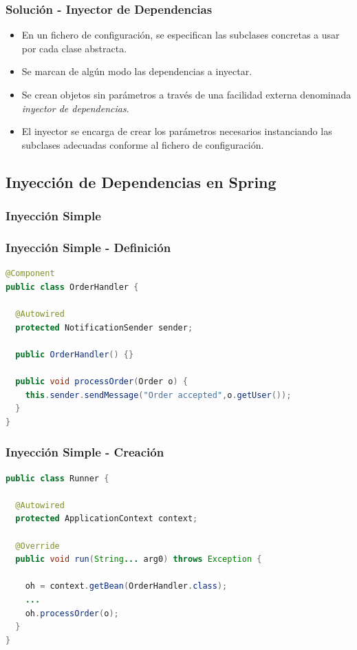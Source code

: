 \documentclass[a4paper,t,xcolor=pst,dvips,colortheme]{beamer}
\begin{document}
\begin{frame}[c]
	\frametitle{Solución - Inyector de Dependencias}
    \begin{itemize}[<+->]
        \item En un fichero de configuración, se especifican las subclases concretas a usar por cada clase abstracta.
        \item Se marcan de algún modo las dependencias a inyectar.
        \item Se crean objetos \alert{sin parámetros} a través de una facilidad externa denominada \emph{inyector de dependencias}.
        \item El inyector se encarga de crear los parámetros necesarios instanciando las subclases adecuadas conforme al fichero de configuración.
    \end{itemize}
\end{frame}

\subsection{Inyección de Dependencias en Spring}

\subsubsection{Inyección Simple}

\begin{frame}[c,fragile]
	\frametitle{Inyección Simple - Definición}
\begin{lstlisting}[basicstyle=\footnotesize,language=Java]
@Component
public class OrderHandler {

  @Autowired
  protected NotificationSender sender;
	
  public OrderHandler() {}
	
  public void processOrder(Order o) {
    this.sender.sendMessage("Order accepted",o.getUser());
  }
}
\end{lstlisting}
\end{frame}

\begin{frame}[c,fragile]
	\frametitle{Inyección Simple - Creación}
\begin{lstlisting}[basicstyle=\footnotesize,language=Java]
public class Runner {

  @Autowired
  protected ApplicationContext context;

  @Override
  public void run(String... arg0) throws Exception {
    	
    oh = context.getBean(OrderHandler.class);
    ...		
	oh.processOrder(o);
  }
}\end{lstlisting}
\end{frame}
\end{document}
